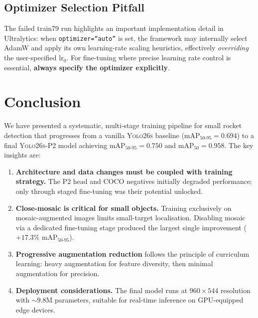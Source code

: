 \documentclass[12pt, titlepage]{article}
\begin{document}
\subsection{Optimizer Selection Pitfall}

The failed train79 run highlights an important implementation detail in
Ultralytics: when \texttt{optimizer=``auto''} is set, the framework may
internally select AdamW and apply its own learning-rate scaling heuristics,
effectively \emph{overriding} the user-specified $\text{lr}_0$. For fine-tuning
where precise learning rate control is essential, \textbf{always specify the
  optimizer explicitly}.

\section{Conclusion}
\label{sec:conclusion}

We have presented a systematic, multi-stage training pipeline for small rocket
detection that progresses from a vanilla \textsc{Yolo26s} baseline
(mAP$_{50\text{-}95} = 0.694$) to a final \textsc{Yolo26s-P2} model achieving
mAP$_{50\text{-}95} = 0.750$ and mAP$_{50} = 0.958$. The key insights are:

\begin{enumerate}[leftmargin=*]
  \item \textbf{Architecture and data changes must be coupled with
          training strategy.}  The P2 head and COCO negatives initially
        degraded performance; only through staged fine-tuning was
        their potential unlocked.

  \item \textbf{Close-mosaic is critical for small objects.}
        Training exclusively on mosaic-augmented images limits
        small-target localisation.  Disabling mosaic via a dedicated
        fine-tuning stage produced the largest single improvement
        ($+17.3\%$ mAP$_{50\text{-}95}$).

  \item \textbf{Progressive augmentation reduction} follows the
        principle of curriculum learning: heavy augmentation for
        feature diversity, then minimal augmentation for precision.

  \item \textbf{Deployment considerations.}  The final model runs
        at $960{\times}544$ resolution with ${\sim}9.8$M parameters,
        suitable for real-time inference on GPU-equipped edge devices.
\end{enumerate}
\end{document}
